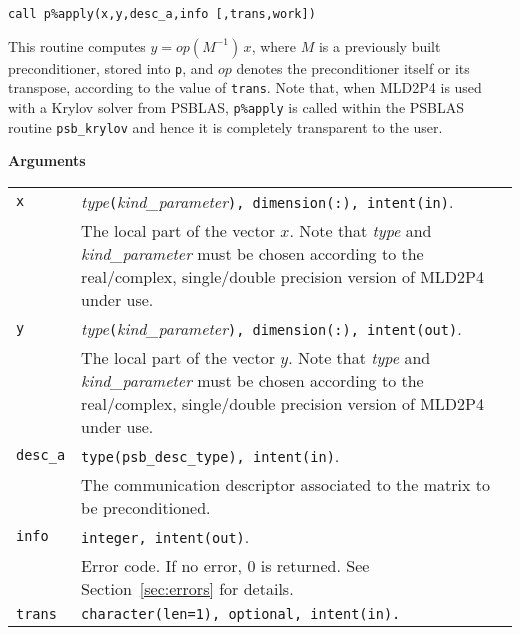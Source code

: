 \begin{center}
\verb|call p%apply(x,y,desc_a,info [,trans,work])|\\
\end{center}

\noindent
This routine computes $y = op(M^{-1})\, x$, where $M$ is a previously built
preconditioner, stored into \verb|p|, and $op$
denotes the preconditioner itself or its transpose, according to
the value of \verb|trans|.
Note that, when MLD2P4 is used with a Krylov solver from PSBLAS,
\verb|p%apply| is called within the PSBLAS routine \verb|psb_krylov|
and hence it is completely transparent to the user.

{\baselineskip\noindent\large\bfseries Arguments} \smallskip

\begin{tabular}{p{1.2cm}p{12cm}}
\verb|x|      & \emph{type}\verb|(|\emph{kind\_parameter}\verb|), dimension(:), intent(in)|.\\
              & The local part of the vector $x$. Note that \emph{type} and   
                \emph{kind\_parameter} must be chosen according
                to the real/complex, single/double precision version of MLD2P4 under use.\\
\verb|y|      & \emph{type}\verb|(|\emph{kind\_parameter}\verb|), dimension(:), intent(out)|.\\
              & The local part of the vector $y$. Note that \emph{type} and
                \emph{kind\_parameter} must be chosen according
                to the real/complex, single/double precision version of MLD2P4 under use.\\
\verb|desc_a| & \verb|type(psb_desc_type), intent(in)|. \\
              & The communication descriptor associated to the matrix to be
                preconditioned.\\
\verb|info|   & \verb|integer, intent(out)|.\\
              & Error code. If no error, 0 is returned. See Section~\ref{sec:errors} for details.\\
\verb|trans|  & \verb|character(len=1), optional, intent(in).|\\

\end{tabular}
